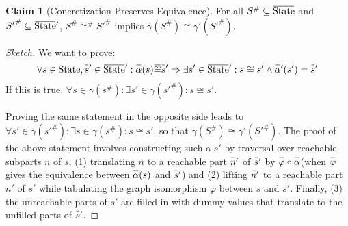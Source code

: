 \documentclass{article}
\theoremstyle{definition}
\newtheorem{clm}{Claim}[section]
\def\ovbarw{1.2mu}
\def\ovbarh{1}
\newcommand*{\ovbar}[1]{\mkern \ovbarw\overline{\mkern-\ovbarw{\smash{#1}\scalebox{1}[\ovbarh]{\vphantom{i}}}\mkern-\ovbarw}\mkern \ovbarw}
\newcommand*{\A}[1]{\ovbar{#1}}
\newcommand*{\Abs}[1]{{#1}^{\#}}
\newcommand*{\State}{\text{State}}
\newcommand*{\AState}{\A{\text{State}}}
\begin{document}
\begin{clm}[Concretization Preserves Equivalence]
  For all $\Abs{S}\subseteq\AState$ and $\Abs{S'}\subseteq\AState'$, $\Abs{S}\Abs\cong\Abs{S'}$ implies $\gamma(\Abs{S})\cong\gamma'(\Abs{S'})$.
\end{clm}
\begin{proof}[Sketch]
  We want to prove:
  \[\forall s\in\State,\A{s}'\in\AState':\A\alpha(s)\A\cong\A{s}'\Rightarrow\exists s'\in\AState':s\cong s'\wedge\A\alpha'(s')=\A{s}'\]
  If this is true, $\forall s\in\gamma(\Abs{s}):\exists s'\in\gamma(\Abs{s'}):s\cong s'$.

  Proving the same statement in the opposite side leads to $\forall s'\in\gamma(\Abs{s'}):\exists s\in\gamma(\Abs{s}):s\cong s'$, so that $\gamma(\Abs{S})\cong\gamma'(\Abs{S'})$.
  The proof of the above statement involves constructing such a $s'$ by traversal over reachable subparts $n$ of $s$, (1) translating $n$ to a reachable part $\A{n}'$ of $\A{s}'$ by $\A\varphi\circ\A\alpha$(when $\A\varphi$ gives the equivalence between $\A\alpha(s)$ and $\A{s}'$) and (2) lifting $\A{n}'$ to a reachable part $n'$ of $s'$ while tabulating the graph isomorphism $\varphi$ between $s$ and $s'$.
  Finally, (3) the unreachable parts of $s'$ are filled in with dummy values that translate to the unfilled parts of $\A{s}'$.
\end{proof}
\end{document}
